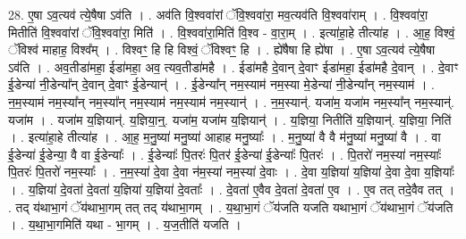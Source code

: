 \documentclass[17pt]{extarticle}
\begin{document}
28. ए॒षा ऽव॒त्यव॑ त्ये॒षैषा ऽव॑ति । . अव॑ति वि॒श्ववा॑रां ॅवि॒श्ववा॑रा॒ मव॒त्यव॑ति वि॒श्ववा॑राम् । . वि॒श्ववा॑रा॒ मितीति॑ वि॒श्ववा॑रां ॅवि॒श्ववा॑रा॒ मिति॑ । . वि॒श्ववा॑रा॒मिति॑ वि॒श्व - वा॒रा॒म् । . इत्या॑हा॒हे तीत्या॑ह । . आ॒ह॒ विश्वं॒ ॅविश्व॑ माहाह॒ विश्व᳚म् । . विश्वꣳ॒॒ हि हि विश्वं॒ ॅविश्वꣳ॒॒ हि । . ह्ये॑षैषा हि ह्ये॑षा । . ए॒षा ऽव॒त्यव॑ त्ये॒षैषा ऽव॑ति । . अव॒तीडा॑महा॒ ईडा॑महा॒ अव॒ त्यव॒तीडा॑महै । . ईडा॑महै दे॒वान् दे॒वाꣳ ईडा॑महा॒ ईडा॑महै दे॒वान् । . दे॒वाꣳ ई॒डेन्या॑ नी॒डेन्या᳚न् दे॒वान् दे॒वाꣳ ई॒डेन्यान्॑ । . ई॒डेन्या᳚न् नम॒स्याम॑ नम॒स्या मे॒डेन्या॑ नी॒डेन्या᳚न् नम॒स्याम॑ । . न॒म॒स्याम॑ नम॒स्या᳚न् नम॒स्या᳚न् नम॒स्याम॑ नम॒स्याम॑ नम॒स्यान्॑ । . न॒म॒स्यान्॑. यजा॑म॒ यजा॑म नम॒स्या᳚न् नम॒स्यान्॑. यजा॑म । . यजा॑म य॒ज्ञियान्॑. य॒ज्ञिया॒न्॒. यजा॑म॒ यजा॑म य॒ज्ञियान्॑ । . य॒ज्ञिया॒ नितीति॑ य॒ज्ञियान्॑. य॒ज्ञिया॒ निति॑ । . इत्या॑हा॒हे तीत्या॑ह । . आ॒ह॒ म॒नु॒ष्या॑ मनु॒ष्या॑ आहाह मनु॒ष्याः᳚ । . म॒नु॒ष्या॑ वै वै म॑नु॒ष्या॑ मनु॒ष्या॑ वै । . वा ई॒डेन्या॑ ई॒डेन्या॒ वै वा ई॒डेन्याः᳚ । . ई॒डेन्याः᳚ पि॒तरः॑ पि॒तर॑ ई॒डेन्या॑ ई॒डेन्याः᳚ पि॒तरः॑ । . पि॒तरो॑ नम॒स्या॑ नम॒स्याः᳚ पि॒तरः॑ पि॒तरो॑ नम॒स्याः᳚ । . न॒म॒स्या॑ दे॒वा दे॒वा न॑म॒स्या॑ नम॒स्या॑ दे॒वाः । . दे॒वा य॒ज्ञिया॑ य॒ज्ञिया॑ दे॒वा दे॒वा य॒ज्ञियाः᳚ । . य॒ज्ञिया॑ दे॒वता॑ दे॒वता॑ य॒ज्ञिया॑ य॒ज्ञिया॑ दे॒वताः᳚ । . दे॒वता॑ ए॒वैव दे॒वता॑ दे॒वता॑ ए॒व । . ए॒व तत् तदे॒वैव तत् । . तद् य॑थाभा॒गं ॅय॑थाभा॒गम् तत् तद् य॑थाभा॒गम् । . य॒था॒भा॒गं ॅय॑जति यजति यथाभा॒गं ॅय॑थाभा॒गं ॅय॑जति । . य॒था॒भा॒गमिति॑ यथा - भा॒गम् । . य॒ज॒तीति॑ यजति । \newline
\end{document}
